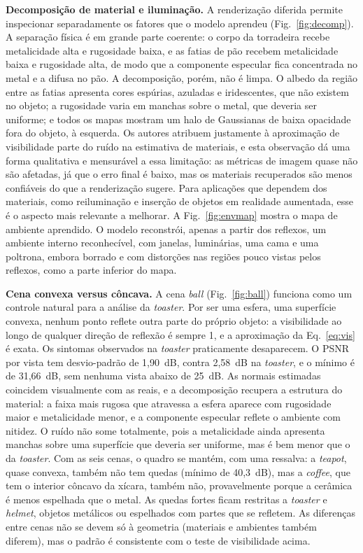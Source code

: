 \documentclass[conference]{IEEEtran}
\begin{document}
\textbf{Decomposição de material e iluminação.} A renderização diferida permite inspecionar separadamente os fatores que o modelo aprendeu (Fig.~\ref{fig:decomp}). A separação física é em grande parte coerente: o corpo da torradeira recebe metalicidade alta e rugosidade baixa, e as fatias de pão recebem metalicidade baixa e rugosidade alta, de modo que a componente especular fica concentrada no metal e a difusa no pão. A decomposição, porém, não é limpa. O albedo da região entre as fatias apresenta cores espúrias, azuladas e iridescentes, que não existem no objeto; a rugosidade varia em manchas sobre o metal, que deveria ser uniforme; e todos os mapas mostram um halo de Gaussianas de baixa opacidade fora do objeto, à esquerda. Os autores atribuem justamente à aproximação de visibilidade parte do ruído na estimativa de materiais, e esta observação dá uma forma qualitativa e mensurável a essa limitação: as métricas de imagem quase não são afetadas, já que o erro final é baixo, mas os materiais recuperados são menos confiáveis do que a renderização sugere. Para aplicações que dependem dos materiais, como reiluminação e inserção de objetos em realidade aumentada, esse é o aspecto mais relevante a melhorar. A Fig.~\ref{fig:envmap} mostra o mapa de ambiente aprendido. O modelo reconstrói, apenas a partir dos reflexos, um ambiente interno reconhecível, com janelas, luminárias, uma cama e uma poltrona, embora borrado e com distorções nas regiões pouco vistas pelos reflexos, como a parte inferior do mapa.

\textbf{Cena convexa versus côncava.} A cena \textit{ball} (Fig.~\ref{fig:ball}) funciona como um controle natural para a análise da \textit{toaster}. Por ser uma esfera, uma superfície convexa, nenhum ponto reflete outra parte do próprio objeto: a visibilidade ao longo de qualquer direção de reflexão é sempre 1, e a aproximação da Eq.~\eqref{eq:vis} é exata. Os sintomas observados na \textit{toaster} praticamente desaparecem. O PSNR por vista tem desvio-padrão de 1,90~dB, contra 2,58~dB na \textit{toaster}, e o mínimo é de 31,66~dB, sem nenhuma vista abaixo de 25~dB. As normais estimadas coincidem visualmente com as reais, e a decomposição recupera a estrutura do material: a faixa mais rugosa que atravessa a esfera aparece com rugosidade maior e metalicidade menor, e a componente especular reflete o ambiente com nitidez. O ruído não some totalmente, pois a metalicidade ainda apresenta manchas sobre uma superfície que deveria ser uniforme, mas é bem menor que o da \textit{toaster}. Com as seis cenas, o quadro se mantém, com uma ressalva: a \textit{teapot}, quase convexa, também não tem quedas (mínimo de 40,3~dB), mas a \textit{coffee}, que tem o interior côncavo da xícara, também não, provavelmente porque a cerâmica é menos espelhada que o metal. As quedas fortes ficam restritas a \textit{toaster} e \textit{helmet}, objetos metálicos ou espelhados com partes que se refletem. As diferenças entre cenas não se devem só à geometria (materiais e ambientes também diferem), mas o padrão é consistente com o teste de visibilidade acima.
\end{document}
